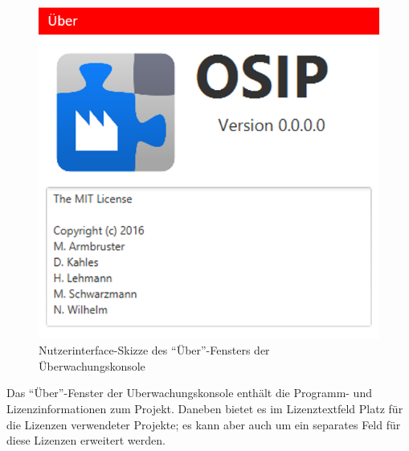\documentclass[parskip=full]{scrartcl}
\begin{document}
\begin{figure}[H]
	\centering
	\includegraphics[scale=0.5]{media/ui-client/ui-uw-uber.png}
	\caption{Nutzerinterface-Skizze des "`Über"'-Fensters der Überwachungskonsole}
\end{figure}
Das "`Über"'-Fenster der \gls{Uberwachungskonsole} enthält die Programm- und Lizenzinformationen zum Projekt. Daneben bietet es im Lizenztextfeld Platz für die Lizenzen verwendeter Projekte; es kann aber auch um ein separates Feld für diese Lizenzen erweitert werden.

\pagebreak
\printglossaries

\pagebreak
{}
{}
\listoffigures
\end{document}
